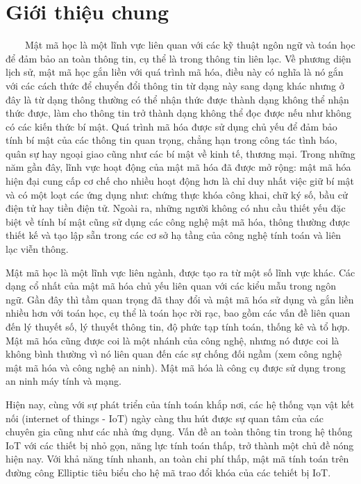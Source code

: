 \documentclass[a4paper,12pt]{report}
\begin{document}
\chapter*{Giới thiệu chung}
\ \ \ \ Mật mã học là một lĩnh vực liên quan với các kỹ thuật ngôn ngữ và toán học để đảm bảo an toàn thông tin, cụ thể là trong thông tin liên lạc. Về phương diện lịch sử, mật mã học gắn liền với quá trình mã hóa, điều này có nghĩa là nó gắn với các cách thức để chuyển đổi thông tin từ dạng này sang dạng khác nhưng ở đây là từ dạng thông thường có thể nhận thức được thành dạng không thể nhận thức được, làm cho thông tin trở thành dạng không thể đọc được nếu như không có các kiến thức bí mật. Quá trình mã hóa được sử dụng chủ yếu để đảm bảo tính bí mật của các thông tin quan trọng, chẳng hạn trong công tác tình báo, quân sự hay ngoại giao cũng như các bí mật về kinh tế, thương mại.  Trong những năm gần đây, lĩnh vực hoạt động của mật mã hóa đã được mở rộng: mật mã hóa hiện đại cung cấp cơ chế cho nhiều hoạt động hơn là chỉ duy nhất việc giữ bí mật và có một loạt các ứng dụng như: chứng thực khóa công khai, chữ ký số, bầu cử điện tử hay tiền điện tử. Ngoài ra, những người không có nhu cầu thiết yếu đặc biệt về tính bí mật cũng sử dụng các công nghệ mật mã hóa, thông thường được thiết kế và tạo lập sẵn trong các cơ sở hạ tầng của công nghệ tính toán và liên lạc viễn thông. 

Mật mã học là một lĩnh vực liên ngành, được tạo ra từ một số lĩnh vực khác. Các dạng cổ nhất của mật mã hóa chủ yếu liên quan với các kiểu mẫu trong ngôn ngữ. Gần đây thì tầm quan trọng đã thay đổi và mật mã hóa sử dụng và gắn liền nhiều hơn với toán học, cụ thể là toán học rời rạc, bao gồm các vấn đề liên quan đến lý thuyết số, lý thuyết thông tin, độ phức tạp tính toán, thống kê và tổ hợp. Mật mã hóa cũng được coi là một nhánh của công nghệ, nhưng nó được coi là không bình thường vì nó liên quan đến các sự chống đối ngầm (xem công nghệ mật mã hóa và công nghệ an ninh). Mật mã hóa là công cụ được sử dụng trong an ninh máy tính và mạng. 

Hiện nay, cùng với sự phát triển của tính toán khắp nơi, các hệ thống vạn vật kết nối (internet of things - IoT) ngày càng thu hút được sự quan tâm của các chuyên gia cũng như các nhà ứng dụng. Vấn đề an toàn thông tin trong hệ thống IoT với các thiết bị nhỏ gọn, năng lực tính toán thấp, trở thành một chủ đề nóng hiện nay. Với khả năng tính nhanh, an toàn chi phí thấp, mật mã tính toán trên đường công Elliptic tiêu biểu cho hệ mã trao đổi khóa của các tehiết bị IoT.
\end{document}
